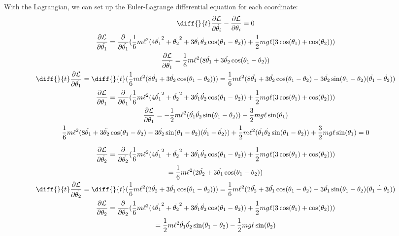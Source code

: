 \documentclass[]{article}
\begin{document}
With the Lagrangian, we can set up the Euler-Lagrange differential equation for each coordinate:
\begin{gather*}
	\diff{}{t}\frac{\partial \lagr}{\partial \dot{\theta_i}} - \frac{\partial \lagr}{\partial \theta_i} = 0 \\
	\frac{\partial \lagr}{\partial \dot{\theta_1}} = \frac{\partial}{\partial \dot{\theta_1}}(\frac16m\ell^2(4\dot{\theta_1}^2 + \dot{\theta_2}^2 + 3\dot{\theta_1}\dot{\theta_2}\cos(\theta_1 - \theta_2)) + \frac12 mg\ell(3\cos(\theta_1) + \cos(\theta_2))) \\
	\frac{\partial \lagr}{\partial \dot{\theta_1}} = \frac16m\ell^2(8\dot{\theta_1} + 3\dot{\theta_2}\cos(\theta_1 - \theta_2)) \\
	\diff{}{t}\frac{\partial \lagr}{\partial \dot{\theta_1}} = \diff{}{t}(\frac16m\ell^2(8\dot{\theta_1} + 3\dot{\theta_2}\cos(\theta_1 - \theta_2))) = \frac16m\ell^2(8\ddot{\theta_1} + 3\ddot{\theta_2}\cos(\theta_1 - \theta_2) - 3\dot{\theta_2}\sin(\theta_1 - \theta_2)(\dot{\theta_1} - \dot{\theta_2})) \\
	\frac{\partial \lagr}{\partial \theta_1} = \frac{\partial}{\partial \theta_1} (\frac16m\ell^2(4\dot{\theta_1}^2 + \dot{\theta_2}^2 + 3\dot{\theta_1}\dot{\theta_2}\cos(\theta_1 - \theta_2)) + \frac12 mg\ell(3\cos(\theta_1) + \cos(\theta_2))) \\
	\frac{\partial \lagr}{\partial \theta_1} = -\frac12m\ell^2(\dot{\theta_1}\dot{\theta_2}\sin(\theta_1 - \theta_2)) - \frac32m g \ell \sin(\theta_1) \\
	\frac16m\ell^2(8\ddot{\theta_1} + 3\ddot{\theta_2}\cos(\theta_1 - \theta_2) - 3\dot{\theta_2}\sin(\theta_1 - \theta_2)(\dot{\theta_1} - \dot{\theta_2})) + \frac12m\ell^2(\dot{\theta_1}\dot{\theta_2}\sin(\theta_1 - \theta_2)) + \frac32m g \ell \sin(\theta_1) =  0
\end{gather*}

\begin{gather*}
	\frac{\partial \lagr}{\partial \dot{\theta_2}} = \frac{\partial}{\partial \dot{\theta_2}}(\frac16m\ell^2(4\dot{\theta_1}^2 + \dot{\theta_2}^2 + 3\dot{\theta_1}\dot{\theta_2}\cos(\theta_1 - \theta_2)) + \frac12 mg\ell(3\cos(\theta_1) + \cos(\theta_2))) \\= \frac16m\ell^2(2\dot{\theta_2} + 3\dot{\theta_1}\cos(\theta_1 - \theta_2)) \\
	\diff{}{t}\frac{\partial \lagr}{\partial \dot{\theta_2}} = \diff{}{t}(\frac16m\ell^2(2\dot{\theta_2} + 3\dot{\theta_1}\cos(\theta_1 - \theta_2))) = \frac16m\ell^2(2\ddot{\theta_2} + 3\ddot{\theta_1}\cos(\theta_1 - \theta_2) - 3\dot{\theta_1}\sin(\theta_1 - \theta_2)(\dot{\theta_1 - \theta_2})) \\
	\frac{\partial \lagr}{\partial \theta_2} = \frac{\partial}{\partial \theta_2}(\frac16m\ell^2(4\dot{\theta_1}^2 + \dot{\theta_2}^2 + 3\dot{\theta_1}\dot{\theta_2}\cos(\theta_1 - \theta_2)) + \frac12 mg\ell(3\cos(\theta_1) + \cos(\theta_2))) \\
	= \frac12m\ell^2\dot{\theta_1}\dot{\theta_2}\sin(\theta_1 - \theta_2) - \frac12mg\ell\sin(\theta_2)
\end{gather*}
\end{document}
